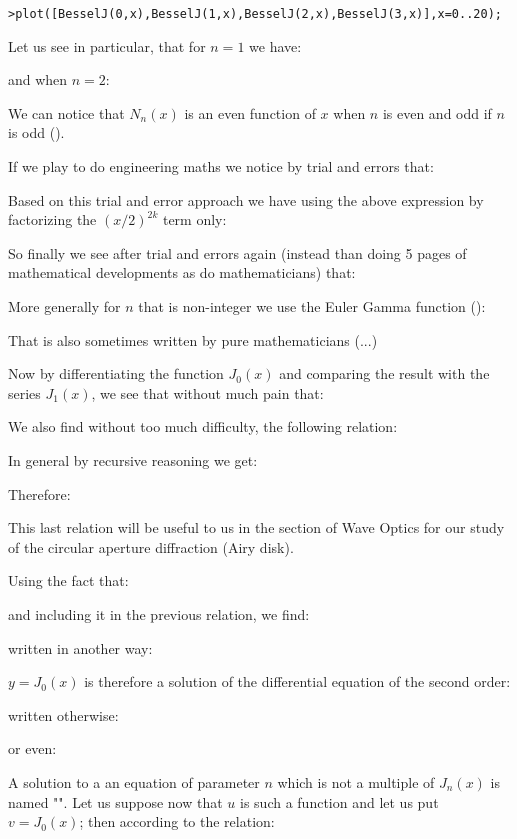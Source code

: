 	\texttt{>plot([BesselJ(0,x),BesselJ(1,x),BesselJ(2,x),BesselJ(3,x)],x=0..20);}
	
	Let us see in particular, that for $n=1$ we have:
	
	and when $n=2$:
	
	We can notice that $N_n(x)$ is an even function of $x$ when $n$ is even and odd if $n$ is odd ().
	
	If we play to do engineering maths we notice by trial and errors that:
	
	Based on this trial and error approach we have using the above expression by factorizing the $(x/2)^{2k}$ term only:
	
	So finally we see after trial and errors again (instead than doing 5 pages of mathematical developments as do mathematicians) that:
	
	More generally for $n$ that is non-integer we use the Euler Gamma function ():
	
	That is also sometimes written by pure mathematicians (...)
	
	Now by differentiating the function $J_0(x)$ and comparing the result with the series $J_1(x)$, we see that without much pain that:
	
	We also find without too much difficulty, the following relation:
	 
	\begin{tcolorbox}[title=Remark,colframe=black,arc=10pt]
	In general by recursive reasoning we get:
	
	Therefore:
	
	This last relation will be useful to us in the section of Wave Optics for our study of the circular aperture diffraction (Airy disk).
	\end{tcolorbox}
	Using the fact that:
	
	and including it in the previous relation, we find:
	
	written in another way:
	
	$y=J_0(x)$ is therefore a solution of the differential equation of the second order:
	
	written otherwise:
	
	or even:
	
	A solution to a an equation of parameter $n$ which is not a multiple of $J_n(x)$ is named "". Let us suppose now that $u$ is such a function and let us put $v=J_0(x)$; then according to the relation:
	
